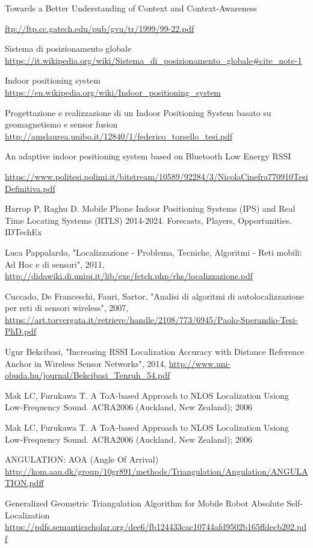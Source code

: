 \begin{thebibliography}{99}

Towards a Better Understanding of Context and Context-Awareness
\author{Anind K. Dey, Gregory D. Abowd}
\url{ftp://ftp.cc.gatech.edu/pub/gvu/tr/1999/99-22.pdf}

Sistema di posizionamento globale
\url{https://it.wikipedia.org/wiki/Sistema_di_posizionamento_globale#cite_note-1}


Indoor positioning system
\url{https://en.wikipedia.org/wiki/Indoor_positioning_system}

Progettazione e realizzazione di un Indoor Positioning System basato su geomagnetismo e sensor fusion
\url{http://amslaurea.unibo.it/12840/1/federico_torsello_tesi.pdf}

An adaptive indoor positioning system based on Bluetooth Low Energy RSSI
\author{Nicola Cinefra}
\url{https://www.politesi.polimi.it/bitstream/10589/92284/3/NicolaCinefra770910TesiDefinitiva.pdf}

Harrop P, Raghu D. Mobile Phone Indoor Positioning Systems (IPS) and Real Time
Locating Systems (RTLS) 2014-2024. Forecasts, Players, Opportunities. IDTechEx

Luca Pappalardo, "Localizzazione - Problema, Tecniche, Algoritmi - Reti mobili:
Ad Hoc e di sensori", 2011,
\url{http://didawiki.di.unipi.it/lib/exe/fetch.php/rhs/localizzazione.pdf}

Cuccado, De Franceschi, Fauri, Sartor, "Analisi di algoritmi di autolocalizzazione
per reti di sensori wireless", 2007,
\url{https://art.torvergata.it/retrieve/handle/2108/773/6945/Paolo-Sperandio-Tesi-PhD.pdf}

Ugur Bekcibasi, "Increasing RSSI Localization Accuracy with Distance Reference
Anchor in Wireless Sensor Networks", 2014,
\url{http://www.uni-obuda.hu/journal/Bekcibasi_Tenruh_54.pdf}

Mak LC, Furukawa T. A ToA-based Approach to NLOS Localization Usiong Low-Frequency Sound. ACRA2006 (Auckland, New Zealand); 2006

Mak LC, Furukawa T. A ToA-based Approach to NLOS Localization Usiong Low-Frequency Sound. ACRA2006 (Auckland, New Zealand); 2006

ANGULATION: AOA (Angle Of Arrival)
\url{http://kom.aau.dk/group/10gr891/methods/Triangulation/Angulation/ANGULATION.pdff}

Generalized Geometric Triangulation Algorithm for Mobile Robot
Absolute Self-Localization 
\url{https://pdfs.semanticscholar.org/dee6/fb124433cac10744afd9502b165ffdecb202.pdf}


\end{thebibliography}



